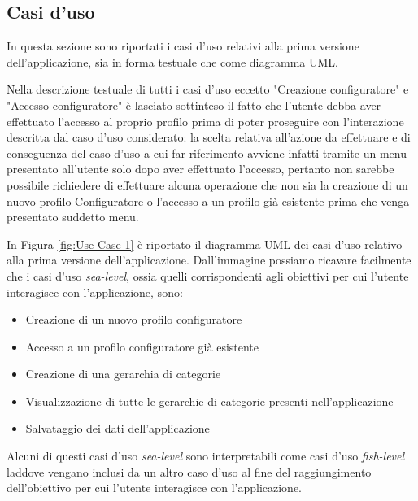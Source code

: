 \subsection{Casi d'uso}
In questa sezione sono riportati i casi d'uso relativi alla prima versione dell'applicazione, sia in forma testuale che come diagramma UML.\bigskip 

Nella descrizione testuale di tutti i casi d'uso eccetto "Creazione configuratore" e "Accesso configuratore" è lasciato sottinteso il fatto che l'utente debba aver effettuato l'accesso al proprio profilo prima di poter proseguire con l'interazione descritta dal caso d'uso considerato: la scelta relativa all'azione da effettuare e di conseguenza del caso d'uso a cui far riferimento avviene infatti tramite un menu presentato all'utente solo dopo aver effettuato l'accesso, pertanto non sarebbe possibile richiedere di effettuare alcuna operazione che non sia la creazione di un nuovo profilo Configuratore o l'accesso a un profilo già esistente prima che venga presentato suddetto menu.\bigskip









\newpage
In Figura \ref{fig:Use Case 1} è riportato il diagramma UML dei casi d'uso relativo alla prima versione dell'applicazione. Dall'immagine possiamo ricavare facilmente che i casi d'uso \textit{sea-level}, ossia quelli corrispondenti agli obiettivi per cui l'utente interagisce con l'applicazione, sono:
\begin{itemize}
    \item Creazione di un nuovo profilo configuratore 
    \item Accesso a un profilo configuratore già esistente
    \item Creazione di una gerarchia di categorie
    \item Visualizzazione di tutte le gerarchie di categorie presenti nell'applicazione
    \item Salvataggio dei dati dell'applicazione
\end{itemize}
Alcuni di questi casi d'uso \textit{sea-level} sono interpretabili come casi d'uso \textit{fish-level} laddove vengano inclusi da un altro caso d'uso al fine del raggiungimento dell'obiettivo per cui l'utente interagisce con l'applicazione.

